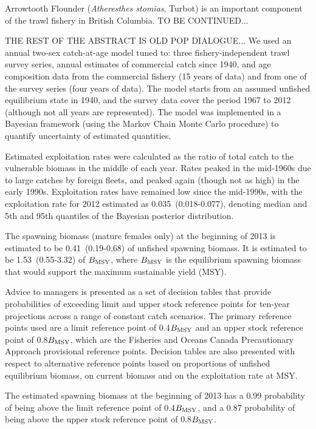 

Arrowtooth Flounder (\emph{Atheresthes stomias}, Turbot) is an important component of the trawl fishery in British Columbia. TO BE CONTINUED...

THE REST OF THE ABSTRACT IS OLD POP DIALOGUE...
We used an annual two-sex catch-at-age model tuned to: three fishery-independent trawl survey series, annual estimates of commercial catch since 1940, and age composition data from the commercial fishery (15 years of data) and from one of the survey series (four years of data). The model starts from an assumed unfished equilibrium state in 1940, and the survey data cover the period 1967 to 2012 (although not all years are represented). The model was implemented in a Bayesian framework (using the Markov Chain Monte Carlo procedure) to quantify uncertainty of estimated quantities.


Estimated exploitation rates were calculated as the ratio of total catch to the vulnerable biomass in the middle of each year. Rates peaked in the mid-1960s due to large catches by foreign fleets, and peaked again (though not as high) in the early 1990s. Exploitation rates have remained low since the mid-1990s, with the exploitation rate for 2012 estimated as 0.035~(0.018-0.077), denoting median and 5th and 95th quantiles of the Bayesian posterior distribution.

The spawning biomass (mature females only) at the beginning of 2013 is estimated to be 0.41~(0.19-0.68) of unfished spawning biomass. It is estimated to be 1.53~(0.55-3.32) of $B_\mathrm{MSY}$, where $B_\mathrm{MSY}$ is the equilibrium spawning biomass that would support the maximum sustainable yield (MSY). 

Advice to managers is presented as a set of decision tables that provide probabilities of exceeding limit and upper stock reference points for ten-year projections across a range of constant catch scenarios. The primary reference points used are a limit reference point of 0.4$B_\mathrm{MSY}$ and an upper stock reference point of 0.8$B_\mathrm{MSY}$, which are the Fisheries and Oceans Canada Precautionary Approach provisional reference points. Decision tables are also presented with respect to alternative reference points based on proportions of unfished equilibrium biomass, on current biomass and on the exploitation rate at MSY.

The estimated spawning biomass at the beginning of 2013 has a 0.99
probability of being above the limit reference point of 0.4$B_\mathrm{MSY}$, and a 0.87 probability of being above the upper stock reference point of 0.8$B_\mathrm{MSY}$.

